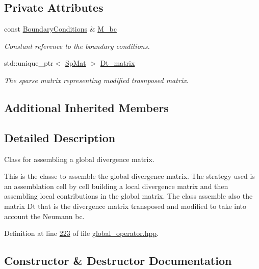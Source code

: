 \subsection*{Private Attributes}
\begin{DoxyCompactItemize}
\item 
const \hyperlink{classFVCode3D_1_1BoundaryConditions}{Boundary\+Conditions} \& \hyperlink{classFVCode3D_1_1global__Div_acdcdafa941eca3b26582f33b71ff3ff3}{M\+\_\+bc}
\begin{DoxyCompactList}\small\item\em Constant reference to the boundary conditions. \end{DoxyCompactList}\item 
std\+::unique\+\_\+ptr$<$ \hyperlink{namespaceFVCode3D_ac1032289d96638cf0ad6c52ef639095f}{Sp\+Mat} $>$ \hyperlink{classFVCode3D_1_1global__Div_ad3f5341b930c36bcf243075f7f3e7414}{Dt\+\_\+matrix}
\begin{DoxyCompactList}\small\item\em The sparse matrix representing modified trasnposed matrix. \end{DoxyCompactList}\end{DoxyCompactItemize}
\subsection*{Additional Inherited Members}


\subsection{Detailed Description}
Class for assembling a global divergence matrix. 

This is the classe to assemble the global divergence matrix. The strategy used is an assemblation cell by cell building a local divergence matrix and then assembling local contributions in the global matrix. The class assemble also the matrix Dt that is the divergence matrix transposed and modified to take into account the Neumann bc. 

Definition at line \hyperlink{global__operator_8hpp_source_l00223}{223} of file \hyperlink{global__operator_8hpp_source}{global\+\_\+operator.\+hpp}.



\subsection{Constructor \& Destructor Documentation}
